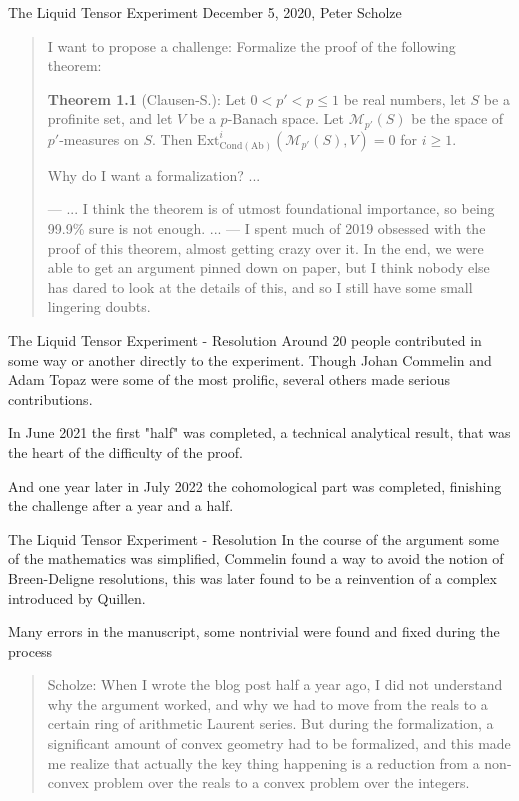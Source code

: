 \documentclass{beamer}
\theoremstyle{plain}
\begin{document}
\begin{frame}{The Liquid Tensor Experiment}
    December 5, 2020, Peter Scholze
    \begin{quote}
        I want to propose a challenge: Formalize the proof of the following theorem:

        {\bf Theorem 1.1} (Clausen-S.): Let $0<p'<p\leq 1$ be real numbers, let $S$ be a profinite set, and let $V$ be a $p$-Banach space. Let $\mathcal M_{p'}(S)$ be the space of $p'$-measures on $S$. Then
        $\mathrm{Ext}^i_{\mathrm{Cond}(\mathrm{Ab})}(\mathcal M_{p'}(S),V)=0$
        for $i\geq 1$.

        Why do I want a formalization?
        ...

        —  ... I think the theorem is of utmost foundational importance, so being 99.9\% sure is not enough.
        ...
        — I spent much of 2019 obsessed with the proof of this theorem, almost getting crazy over it. In the end, we were able to get an argument pinned down on paper, but I think nobody else has dared to look at the details of this, and so I still have some small lingering doubts.
    \end{quote}
\end{frame}

\begin{frame}{The Liquid Tensor Experiment - Resolution}
    Around 20 people contributed in some way or another directly to the experiment. Though Johan Commelin and Adam Topaz were some of the most prolific, several others made serious contributions.

    In June 2021 the first "half" was completed, a technical analytical result, that was the heart of the difficulty of the proof.

    And one year later in July 2022 the cohomological part was completed, finishing the challenge after a year and a half.
\end{frame}

\begin{frame}{The Liquid Tensor Experiment - Resolution}
    In the course of the argument some of the mathematics was simplified, Commelin found a way to avoid the notion of Breen-Deligne resolutions, this was later found to be a reinvention of a complex introduced by Quillen.

    Many errors in the manuscript, some nontrivial were found and fixed during the process

    \begin{quote}
        Scholze:
        When I wrote the blog post half a year ago, I did not understand why the argument worked, and why we had to move from the reals to a certain ring of arithmetic Laurent series. But during the formalization, a significant amount of convex geometry had to be formalized, and this made me realize that actually the key thing happening is a reduction from a non-convex problem over the reals to a convex problem over the integers.
    \end{quote}
\end{frame}
\end{document}
